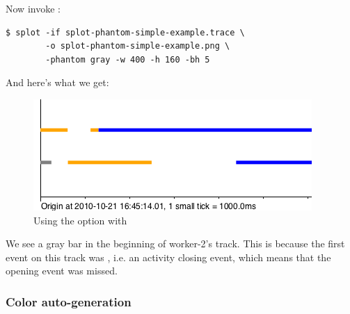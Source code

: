 \documentclass{article}
\begin{document}
Now invoke \splot{}:
\begin{verbatim}
$ splot -if splot-phantom-simple-example.trace \
        -o splot-phantom-simple-example.png \
        -phantom gray -w 400 -h 160 -bh 5 
\end{verbatim}

And here's what we get:

\begin{figure}[h!]
\center
\includegraphics[scale=0.5]{pics/splot/splot-phantom-simple-example.png}
\caption{Using the  option with \splot{}}
\end{figure}

We see a gray bar in the beginning of worker-2's track. This is because the first event on this track was , i.e. an activity closing event, which means that the opening event was missed.

\subsubsection{Color auto-generation}
\end{document}
